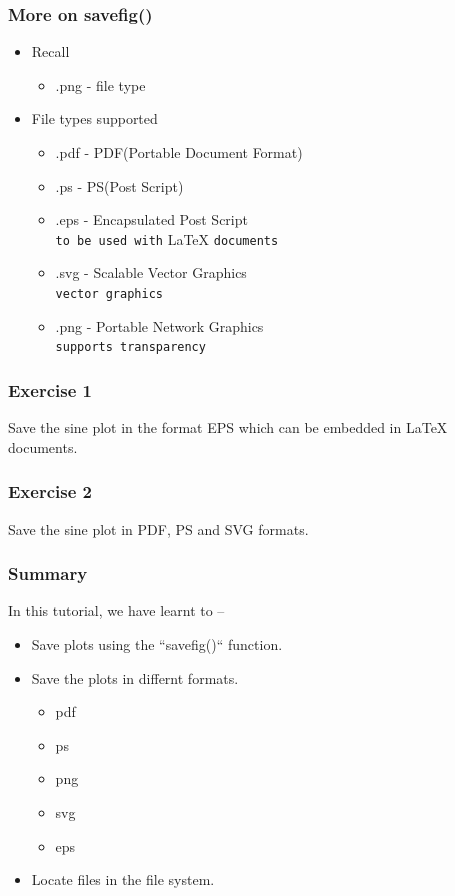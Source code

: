\documentclass[presentation]{beamer}
\begin{document}
\begin{frame}
\frametitle{More on savefig()}
\label{sec-6}
\begin{itemize}

\item Recall\\
\label{sec-6_1}%
\begin{itemize}
\item .png - file type
\end{itemize}

\item File types supported
\label{sec-6_2}%
\begin{itemize}

\item .pdf - PDF(Portable Document Format)\\
\label{sec-6_2_1}%
\item .ps - PS(Post Script)\\
\label{sec-6_2_2}%
\item .eps - Encapsulated Post Script\\
\label{sec-6_2_3}%
\verb~to be used with~ \LaTeX{} \verb~documents~

\item .svg - Scalable Vector Graphics\\
\label{sec-6_2_4}%
\verb~vector graphics~

\item .png - Portable Network Graphics\\
\label{sec-6_2_5}%
\verb~supports transparency~
\end{itemize} %
\end{itemize} %
\end{frame}
\begin{frame}
\frametitle{Exercise 1}
\label{sec-7}

  Save the sine plot in the format EPS which can be embedded in \LaTeX{} documents.
\end{frame}
\begin{frame}
\frametitle{Exercise 2}
\label{sec-8}

  Save the sine plot in PDF, PS and SVG formats.
\end{frame}
\begin{frame}
\frametitle{Summary}
\label{sec-9}

  In this tutorial, we have learnt to –

\begin{itemize}
\item Save plots using the ``savefig()`` function.
\item Save the plots in differnt formats.
\begin{itemize}
\item pdf
\item ps
\item png
\item svg
\item eps
\end{itemize}
\item Locate files in the file system.
\end{itemize}
\end{frame}
\end{document}

